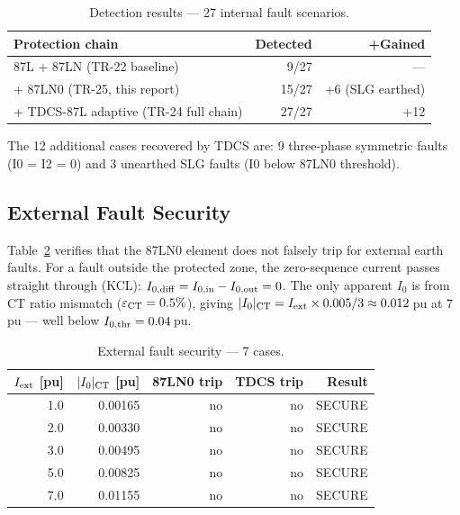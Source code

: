 \documentclass[11pt,a4paper]{article}
\begin{document}
\begin{table}[h!]
\centering
\caption{Detection results — 27 internal fault scenarios.}
\label{tab:results}
\begin{tabular}{lrr}
\toprule
Protection chain & Detected & +Gained \\
\midrule
87L + 87LN (TR-22 baseline)            &  9/27 & ---   \\
+ 87LN0 (TR-25, this report)           & 15/27 & +6 (SLG earthed) \\
+ TDCS-87L adaptive (TR-24 full chain) & 27/27 & +12  \\
\bottomrule
\end{tabular}
\end{table}

The 12 additional cases recovered by TDCS are: 9 three-phase symmetric faults
(I0 = I2 = 0) and 3 unearthed SLG faults (I0 below 87LN0 threshold).

\subsection{External Fault Security}

Table~\ref{tab:security} verifies that the 87LN0 element does not falsely
trip for external earth faults.  For a fault outside the protected zone, the
zero-sequence current passes straight through (KCL):
$I_{0,\rm diff} = I_{0,\rm in} - I_{0,\rm out} = 0$.  The only apparent
$I_0$ is from CT ratio mismatch ($\varepsilon_{\rm CT} = 0.5\%$), giving
$|I_0|_{\rm CT} = I_{\rm ext}\times 0.005/3 \approx 0.012$\,pu at 7\,pu —
well below $I_{0,\rm thr} = 0.04$\,pu.

\begin{table}[h!]
\centering
\caption{External fault security — 7 cases.}
\label{tab:security}
\begin{tabular}{rrrrr}
\toprule
$I_{\rm ext}$ [pu] & $|I_0|_{\rm CT}$ [pu] & 87LN0 trip & TDCS trip & Result \\
\midrule
1.0 & 0.00165 & no & no & SECURE \\
2.0 & 0.00330 & no & no & SECURE \\
3.0 & 0.00495 & no & no & SECURE \\
5.0 & 0.00825 & no & no & SECURE \\
7.0 & 0.01155 & no & no & SECURE \\
\bottomrule
\end{tabular}
\end{table}

\end{document}
